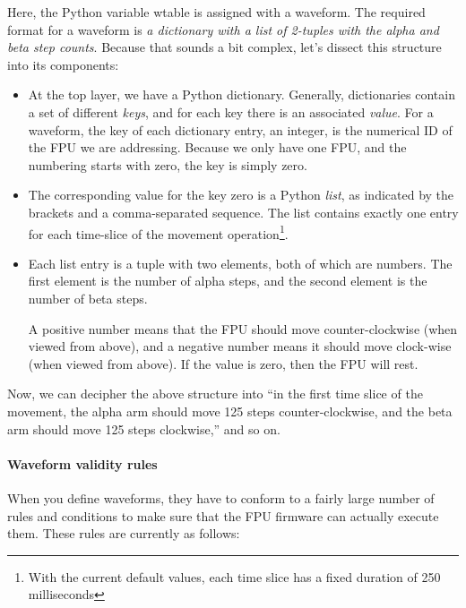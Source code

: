 \documentclass[11pt,a4paper]{scrartcl}
\begin{document}
Here, the Python variable wtable is assigned with
a waveform. The required format for a waveform
is \emph{a dictionary with a list of 2-tuples
  with the alpha and beta step counts}. Because
that sounds a bit complex, let's dissect this
structure into its components:

\begin{itemize}
  
\item At the top layer, we have a Python dictionary. Generally,
  dictionaries contain a set of different \emph{keys}, and for each
  key there is an associated \emph{value}. For a waveform, the key of
  each dictionary entry, an integer, is the numerical ID of the FPU we
  are addressing.  Because we only have one FPU, and the numbering
  starts with zero, the key is simply zero.

\item The corresponding value for the key zero is a Python
  \emph{list}, as indicated by the brackets and a comma-separated
  sequence. The list contains exactly one entry for each time-slice of
  the movement operation\footnote{With the current default values,
    each time slice has a fixed duration of 250 milliseconds}.

\item Each list entry is a tuple with two elements, both of which are
  numbers. The first element is the number of alpha steps, and the
  second element is the number of beta steps.

  A positive number means that the FPU should move counter-clockwise
  (when viewed from above), and a negative number means it should move
  clock-wise (when viewed from above). If the value is zero, then the
  FPU will rest.

\end{itemize}

Now, we can decipher the above structure into ``in the first time
slice of the movement, the alpha arm should move 125 steps
counter-clockwise, and the beta arm should move 125 steps
clockwise,'' and so on.

\paragraph{Waveform validity rules}

When you define waveforms, they have to conform to a fairly large
number of rules and conditions to make sure that the FPU firmware can
actually execute them. These rules are currently as follows:
\end{document}
